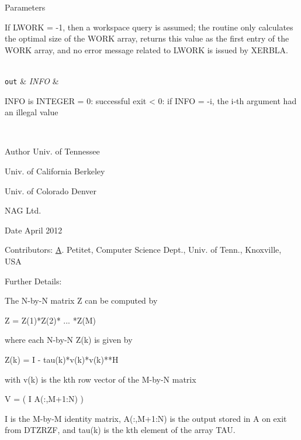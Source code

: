 \begin{DoxyParams}[1]{Parameters}
\begin{DoxyVerb}
          If LWORK = -1, then a workspace query is assumed; the routine
          only calculates the optimal size of the WORK array, returns
          this value as the first entry of the WORK array, and no error
          message related to LWORK is issued by XERBLA.\end{DoxyVerb}
\\
\hline
\mbox{\tt out}  & {\em I\+N\+F\+O} & \begin{DoxyVerb}          INFO is INTEGER
          = 0:  successful exit
          < 0:  if INFO = -i, the i-th argument had an illegal value\end{DoxyVerb}
 \\
\hline
\end{DoxyParams}
\begin{DoxyAuthor}{Author}
Univ. of Tennessee 

Univ. of California Berkeley 

Univ. of Colorado Denver 

N\+A\+G Ltd. 
\end{DoxyAuthor}
\begin{DoxyDate}{Date}
April 2012 
\end{DoxyDate}
\begin{DoxyParagraph}{Contributors\+: }
\hyperlink{classA}{A}. Petitet, Computer Science Dept., Univ. of Tenn., Knoxville, U\+S\+A 
\end{DoxyParagraph}
\begin{DoxyParagraph}{Further Details\+: }
\begin{DoxyVerb}  The N-by-N matrix Z can be computed by

     Z =  Z(1)*Z(2)* ... *Z(M)

  where each N-by-N Z(k) is given by

     Z(k) = I - tau(k)*v(k)*v(k)**H

  with v(k) is the kth row vector of the M-by-N matrix

     V = ( I   A(:,M+1:N) )

  I is the M-by-M identity matrix, A(:,M+1:N) 
  is the output stored in A on exit from DTZRZF,
  and tau(k) is the kth element of the array TAU.\end{DoxyVerb}
 
\end{DoxyParagraph}
